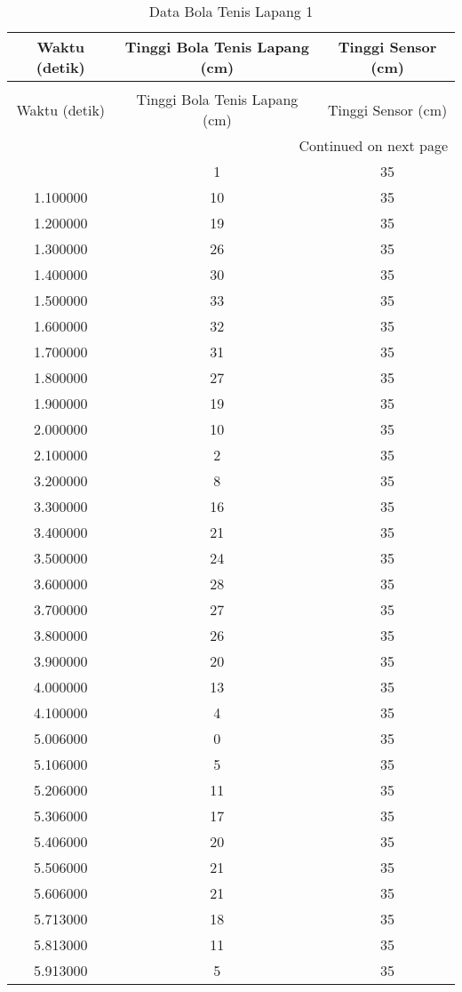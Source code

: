 \begin{longtable}[htbp]{|c|c|c|}
\caption{Data Bola Tenis Lapang 1} \\
\hline
Waktu (detik) & Tinggi Bola Tenis Lapang (cm) & Tinggi Sensor (cm) \\ \hline
\endfirsthead
\caption[]{Data Bola Tenis Lapang 1} \\
\hline
Waktu (detik) & Tinggi Bola Tenis Lapang (cm) & Tinggi Sensor (cm) \\ \hline
\endhead
\multicolumn{3}{r}{Continued on next page} \\
\endfoot
\endlastfoot
1.000000 & 1 & 35 \\ \hline
1.100000 & 10 & 35 \\ \hline
1.200000 & 19 & 35 \\ \hline
1.300000 & 26 & 35 \\ \hline
1.400000 & 30 & 35 \\ \hline
1.500000 & 33 & 35 \\ \hline
1.600000 & 32 & 35 \\ \hline
1.700000 & 31 & 35 \\ \hline
1.800000 & 27 & 35 \\ \hline
1.900000 & 19 & 35 \\ \hline
2.000000 & 10 & 35 \\ \hline
2.100000 & 2 & 35 \\ \hline
3.200000 & 8 & 35 \\ \hline
3.300000 & 16 & 35 \\ \hline
3.400000 & 21 & 35 \\ \hline
3.500000 & 24 & 35 \\ \hline
3.600000 & 28 & 35 \\ \hline
3.700000 & 27 & 35 \\ \hline
3.800000 & 26 & 35 \\ \hline
3.900000 & 20 & 35 \\ \hline
4.000000 & 13 & 35 \\ \hline
4.100000 & 4 & 35 \\ \hline
5.006000 & 0 & 35 \\ \hline
5.106000 & 5 & 35 \\ \hline
5.206000 & 11 & 35 \\ \hline
5.306000 & 17 & 35 \\ \hline
5.406000 & 20 & 35 \\ \hline
5.506000 & 21 & 35 \\ \hline
5.606000 & 21 & 35 \\ \hline
5.713000 & 18 & 35 \\ \hline
5.813000 & 11 & 35 \\ \hline
5.913000 & 5 & 35 \\ \hline
\end{longtable}
